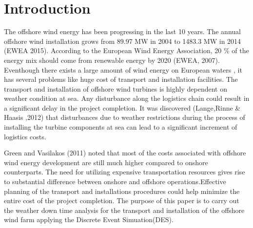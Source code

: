 \section{Introduction}
The offshore wind energy has been progressing in the last 10 years. The annual offshore wind installation grows from 89.97 MW in 2004 to 1483.3 MW in 2014 (EWEA 2015). According to the European Wind Energy Association, 20 \% of the energy mix should come from renewable energy by 2020 (EWEA, 2007). Eventhough there exists a large amount of wind energy on European waters , it has several problems like huge cost of transport and installation facilities. The transport and installation of offshore wind turbines is highly dependent on weather condition at sea. Any disturbance along the logistics chain could result in a significant delay in the project completion. It was discovered (Lange,Rinne & Haasis ,2012) that disturbances due to weather restrictions during the process of installing the turbine components at sea can lead to a significant increment of logistics costs.

Green and Vasilakos (2011) noted that most of the costs associated with offshore wind energy development are still much higher compared to onshore counterparts. The need for utilizing expensive transportation resources gives rise to substantial difference between onshore and offshore operations.Effective planning of the transport and installations procedures could help minimize the entire cost of the project completion. The purpose of this paper is to carry out the weather down time analysis for the transport and installation of the offshore wind farm applying the Discrete Event Simuation(DES).